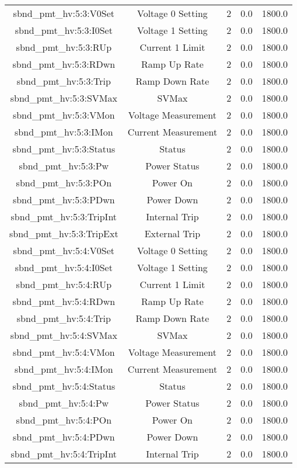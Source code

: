 \begin{table}[ptb]
\begin{tabular}{c | c c c c}
sbnd_pmt_hv:5:3:V0Set & Voltage 0 Setting & 2 & 0.0 & 1800.0\\ 
sbnd_pmt_hv:5:3:I0Set & Voltage 1 Setting & 2 & 0.0 & 1800.0\\ 
sbnd_pmt_hv:5:3:RUp & Current 1 Limit & 2 & 0.0 & 1800.0\\ 
sbnd_pmt_hv:5:3:RDwn & Ramp Up Rate & 2 & 0.0 & 1800.0\\ 
sbnd_pmt_hv:5:3:Trip & Ramp Down Rate & 2 & 0.0 & 1800.0\\ 
sbnd_pmt_hv:5:3:SVMax & SVMax & 2 & 0.0 & 1800.0\\ 
sbnd_pmt_hv:5:3:VMon & Voltage Measurement & 2 & 0.0 & 1800.0\\ 
sbnd_pmt_hv:5:3:IMon & Current Measurement & 2 & 0.0 & 1800.0\\ 
sbnd_pmt_hv:5:3:Status & Status & 2 & 0.0 & 1800.0\\ 
sbnd_pmt_hv:5:3:Pw & Power Status & 2 & 0.0 & 1800.0\\ 
sbnd_pmt_hv:5:3:POn & Power On & 2 & 0.0 & 1800.0\\ 
sbnd_pmt_hv:5:3:PDwn & Power Down & 2 & 0.0 & 1800.0\\ 
sbnd_pmt_hv:5:3:TripInt & Internal Trip & 2 & 0.0 & 1800.0\\ 
sbnd_pmt_hv:5:3:TripExt & External Trip & 2 & 0.0 & 1800.0\\ 
sbnd_pmt_hv:5:4:V0Set & Voltage 0 Setting & 2 & 0.0 & 1800.0\\ 
sbnd_pmt_hv:5:4:I0Set & Voltage 1 Setting & 2 & 0.0 & 1800.0\\ 
sbnd_pmt_hv:5:4:RUp & Current 1 Limit & 2 & 0.0 & 1800.0\\ 
sbnd_pmt_hv:5:4:RDwn & Ramp Up Rate & 2 & 0.0 & 1800.0\\ 
sbnd_pmt_hv:5:4:Trip & Ramp Down Rate & 2 & 0.0 & 1800.0\\ 
sbnd_pmt_hv:5:4:SVMax & SVMax & 2 & 0.0 & 1800.0\\ 
sbnd_pmt_hv:5:4:VMon & Voltage Measurement & 2 & 0.0 & 1800.0\\ 
sbnd_pmt_hv:5:4:IMon & Current Measurement & 2 & 0.0 & 1800.0\\ 
sbnd_pmt_hv:5:4:Status & Status & 2 & 0.0 & 1800.0\\ 
sbnd_pmt_hv:5:4:Pw & Power Status & 2 & 0.0 & 1800.0\\ 
sbnd_pmt_hv:5:4:POn & Power On & 2 & 0.0 & 1800.0\\ 
sbnd_pmt_hv:5:4:PDwn & Power Down & 2 & 0.0 & 1800.0\\ 
sbnd_pmt_hv:5:4:TripInt & Internal Trip & 2 & 0.0 & 1800.0\\ 

\end{tabular}
\end{table}
